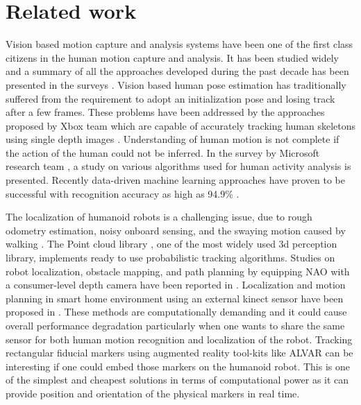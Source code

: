 \documentclass{llncs}
\begin{document}
\section{Related work}
\quad Vision based motion capture and analysis systems have been one of the first class citizens in the human motion capture and analysis. It has been studied widely and a summary of all the approaches developed during the past decade has been presented in the surveys \cite{moeslund2006survey}\cite{poppe2007vision}. Vision based human pose estimation has traditionally suffered from the requirement to adopt an initialization pose and losing track after a few frames. These problems have been addressed by the approaches proposed by Xbox team \cite{Kinect2014} which are capable of accurately tracking human skeletons using single depth images \cite{shotton2013efficient}. Understanding of human motion is not complete if the action of the human could not be inferred. In the survey by Microsoft research team \cite{han2013enhanced}, a study on various algorithms used for human activity analysis is presented. Recently data-driven machine learning approaches have proven to be successful with recognition accuracy as high as 94.9\% \cite{Kinect2014}.
	
	The localization of humanoid robots is a challenging issue, due to rough odometry estimation, noisy onboard sensing, and the swaying motion caused by walking \cite{cervera2012localization}. The Point cloud library \cite{rusu20113d}, one of the most widely used 3d perception library, implements ready to use probabilistic tracking algorithms. Studies on robot localization, obstacle mapping, and path planning by equipping NAO with a consumer-level depth camera have been reported in \cite{maier2012real}. Localization and motion planning in smart home environment using an external kinect sensor have been proposed in \cite{cervera2012localization}. These methods are computationally demanding and it could cause overall performance degradation particularly when one wants to share the same sensor for both human motion recognition and localization of the robot. Tracking rectangular fiducial markers using augmented reality tool-kits like ALVAR \cite{ALVAR} can be interesting if one could embed those markers on the humanoid robot. This is one of the simplest and cheapest solutions in terms of computational power as it can provide position and orientation of the physical markers in real time.
	
\end{document}
